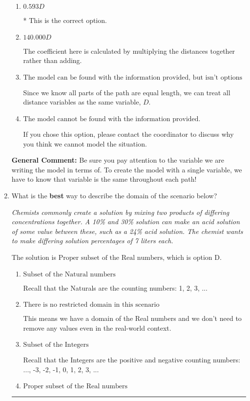\documentclass{extbook}[14pt]
\newcommand{\litem}[1]{\item #1

\rule{\textwidth}{0.4pt}}
\begin{document}
\begin{enumerate}
{\begin{enumerate}[label=\Alph*.]
The coefficient here is calculated as if you were trying to model the distance on the total path.
\item \( 0.593 D \)

* This is the correct option.
\item \( 140.000 D \)

The coefficient here is calculated by multiplying the distances together rather than adding.
\item \( \text{The model can be found with the information provided, but isn't options 1-3.} \)

Since we know all parts of the path are equal length, we can treat all distance variables as the same variable, $D$.
\item \( \text{The model cannot be found with the information provided.} \)

If you chose this option, please contact the coordinator to discuss why you think we cannot model the situation.
\end{enumerate}

\textbf{General Comment:} Be sure you pay attention to the variable we are writing the model in terms of. To create the model with a single variable, we have to know that variable is the same throughout each path!
}
\litem{
What is the \textbf{best} way to describe the domain of the scenario below?

\begin{center}
    \textit{ Chemists commonly create a solution by mixing two products of differing concentrations together. A 10\% and 30\% solution can make an acid solution of some value between these, such as a 24\% acid solution. The chemist wants to make differing solution percentages of 7 liters each. }
\end{center}
The solution is \( \text{Proper subset of the Real numbers} \), which is option D.\begin{enumerate}[label=\Alph*.]
\item \( \text{Subset of the Natural numbers} \)

Recall that the Naturals are the counting numbers: 1, 2, 3, ...
\item \( \text{There is no restricted domain in this scenario} \)

This means we have a domain of the Real numbers and we don't need to remove any values even in the real-world context.
\item \( \text{Subset of the Integers} \)

Recall that the Integers are the positive and negative counting numbers: ..., -3, -2, -1, 0, 1, 2, 3, ... 
\item \( \text{Proper subset of the Real numbers} \)


\end{enumerate}}
\end{enumerate}
\end{document}
